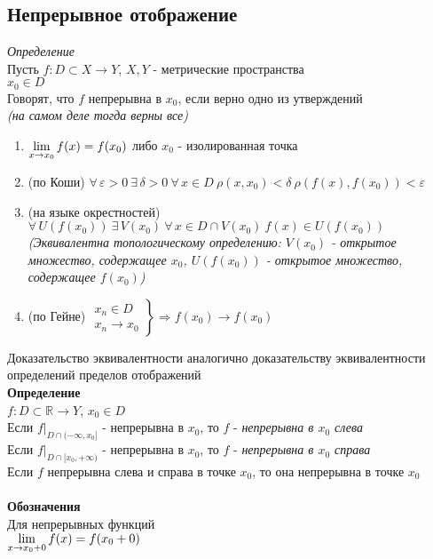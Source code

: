 \documentclass[12pt]{article}
\begin{document}
\subsection{Непрерывное отображение}
\textit{Определение}\\
Пусть $f:D\subset X \rightarrow Y$, $X,Y$ - метрические пространства\\
$x_0 \in D$\\
Говорят, что $f$ непрерывна в $x_0$, если верно одно из утверждений\\
\textit{(на самом деле тогда верны все)}
\begin{enumerate}
    \item $\lim\limits_{x \rightarrow x_0} f(x) = f(x_0)$ либо $x_0$ - изолированная точка
    \item (по Коши) $\forall\,\varepsilon > 0\ \exists\,\delta > 0\ \forall\,x\in D\ \rho(x,x_0)<\delta\ \rho(f(x), f(x_0)) < \varepsilon$
    \item (на языке окрестностей) $\forall\,U(f(x_0))\ \exists\,V(x_0)\ \forall\, x\in D \cap V(x_0)\ f(x) \in U(f(x_0))$\\
    \textit{(Эквивалентна топологическому определению: $V(x_0)$ - открытое множество, содержащее $x_0$, $U(f(x_0))$ - открытое множество, содержащее $f(x_0)$)}
    \item (по Гейне) $\left.\begin{array}{c}
         x_n \in D \\
         x_n \rightarrow x_0
    \end{array}\right\}\Rightarrow f(x_0) \rightarrow f(x_0)$
\end{enumerate}
Доказательство эквивалентности аналогично доказательству эквивалентности определений пределов отображений\\
\textbf{Определение}\\
$f:D\subset\mathbb{R} \rightarrow Y$, $x_0\in D$\\
Если $f|_{D\cap (-\infty, x_0]}$ - непрерывна в $x_0$, то $f$ - \textit{непрерывна в $x_0$ слева}\\
Если $f|_{D\cap [x_0, +\infty)}$ - непрерывна в $x_0$, то $f$ - \textit{непрерывна в $x_0$ справа}\\
Если $f$ непрерывна слева и справа в точке $x_0$, то она непрерывна в точке $x_0$\\\\
\textbf{Обозначения}\\
Для непрерывных функций\\
$\lim\limits_{x\rightarrow x_0+0} f(x) = f(x_0+0)$\\
\end{document}
